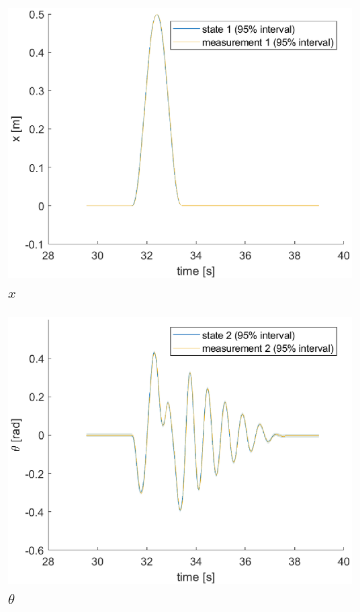 \documentclass[a4paper,kul]{kulakarticle} %
\begin{document}
\begin{figure}[htp!]
	\centering
	\begin{subfigure}[b]{0.48\textwidth}
		\centering
		\includegraphics[width=\textwidth]{state1.eps}
		\caption{$x$}
	\end{subfigure}
	\hfill
	\begin{subfigure}[b]{0.48\textwidth}  
		\centering 
		\includegraphics[width=\textwidth]{state2.eps}
		\caption{$\theta$}
	\end{subfigure}
	\begin{subfigure}[b]{0.48\textwidth}  
		\centering 

\end{subfigure}
\end{figure}
\end{document}

